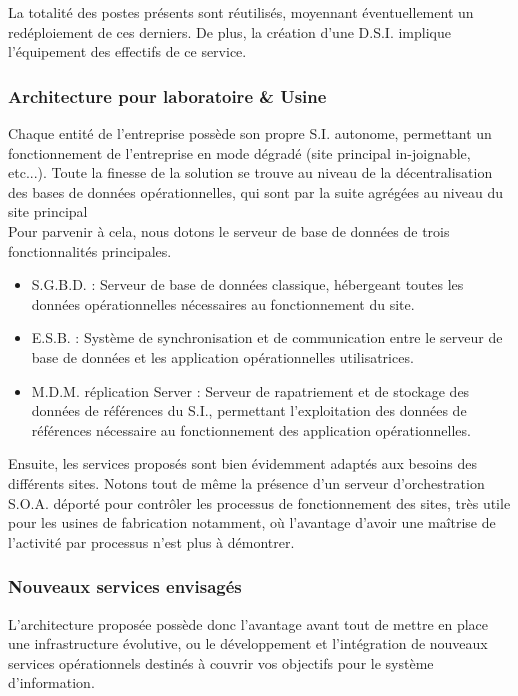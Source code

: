 La totalité des postes présents sont réutilisés, moyennant éventuellement un redéploiement de ces derniers. De plus, la création d'une D.S.I. implique l'équipement des effectifs de ce service.

\subsubsection{Architecture pour laboratoire \& Usine}

Chaque entité de l'entreprise possède son propre S.I. autonome, permettant un fonctionnement de l'entreprise en mode dégradé (site principal in-joignable, etc...).
Toute la finesse de la solution se trouve au niveau de la décentralisation des bases de données opérationnelles, qui sont par la suite agrégées au niveau du site principal \\
Pour parvenir  à cela, nous dotons le serveur de base de données de trois fonctionnalités principales.
\begin{itemize}
\item S.G.B.D. : Serveur de base de données classique, hébergeant toutes les données opérationnelles nécessaires au fonctionnement du site.
\item E.S.B. : Système de synchronisation et de communication entre le serveur de base de données et les application opérationnelles utilisatrices.
\item M.D.M. réplication Server : Serveur de rapatriement et de stockage des données de références du S.I., permettant l'exploitation des données de références nécessaire au fonctionnement des application opérationnelles.
\end{itemize}

Ensuite, les services proposés sont bien évidemment adaptés aux besoins des différents sites. Notons tout de même la présence d'un serveur d'orchestration S.O.A. déporté pour contrôler les processus de fonctionnement des sites, très utile pour les usines de fabrication notamment, où l'avantage d'avoir une maîtrise de l'activité par processus n'est plus à démontrer.

\subsubsection{Nouveaux services envisagés}

L'architecture proposée possède donc l'avantage avant tout de mettre en place une infrastructure évolutive, ou le développement et l'intégration de nouveaux services opérationnels destinés à couvrir vos objectifs pour le système d'information.

